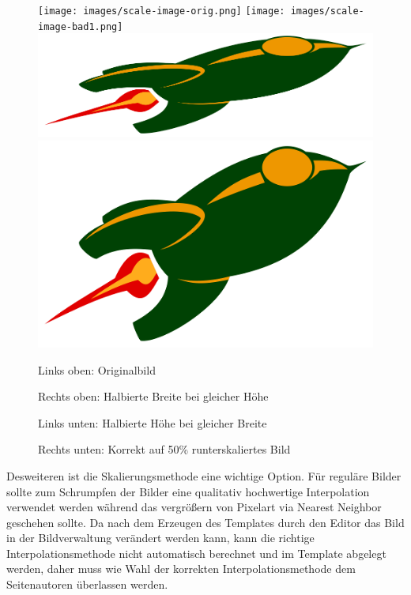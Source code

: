 \begin{figure}
  \texttt{[image: images/scale-image-orig.png]}
  \texttt{[image: images/scale-image-bad1.png]}
  \includegraphics[width=\columnwidth/100*66]{images/scale-image-bad2.png}
  \includegraphics[width=\columnwidth/100*33]{images/scale-image-good.png}

  Links oben: Originalbild

  Rechts oben: Halbierte Breite bei gleicher Höhe

  Links unten: Halbierte Höhe bei gleicher Breite

  Rechts unten: Korrekt auf 50\% runterskaliertes Bild
\end{figure}

Desweiteren ist die Skalierungsmethode eine wichtige Option. Für reguläre Bilder
sollte zum Schrumpfen der Bilder eine qualitativ hochwertige Interpolation
verwendet werden während das vergrößern von Pixelart via Nearest Neighbor
geschehen sollte. Da nach dem Erzeugen des Templates durch den Editor das Bild
in der Bildverwaltung verändert werden kann, kann die richtige
Interpolationsmethode nicht automatisch berechnet und im Template abgelegt
werden, daher muss wie Wahl der korrekten Interpolationsmethode dem
Seitenautoren überlassen werden.

